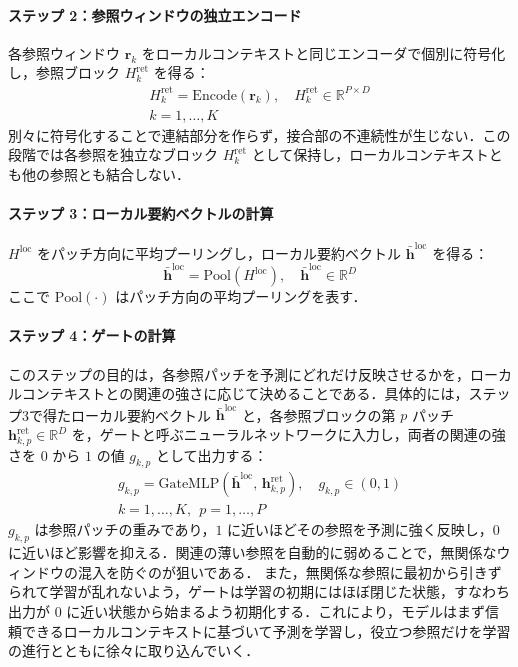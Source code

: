 \documentclass[twocolumn, lastpage]{jarticle}
\begin{document}
    \paragraph{ステップ 2：参照ウィンドウの独立エンコード}
    各参照ウィンドウ $\bm{r}_k$ をローカルコンテキストと同じエンコーダで個別に符号化し，参照ブロック $H^{\mathrm{ret}}_k$ を得る：
        \begin{align}
            H^{\mathrm{ret}}_k = \mathrm{Encode}(\bm{r}_k), \quad
            H^{\mathrm{ret}}_k \in \mathbb{R}^{P \times D} \\
            k = 1, \dots, K \nonumber
        \end{align}
    別々に符号化することで連結部分を作らず，接合部の不連続性が生じない．この段階では各参照を独立なブロック $H^{\mathrm{ret}}_k$ として保持し，ローカルコンテキストとも他の参照とも結合しない．

    \paragraph{ステップ 3：ローカル要約ベクトルの計算}
    $H^{\mathrm{loc}}$ をパッチ方向に平均プーリングし，ローカル要約ベクトル $\bar{\bm{h}}^{\mathrm{loc}}$ を得る：
        \begin{equation}
            \bar{\bm{h}}^{\mathrm{loc}} = \mathrm{Pool}(H^{\mathrm{loc}}), \quad \bar{\bm{h}}^{\mathrm{loc}} \in \mathbb{R}^{D}
        \end{equation}
    ここで $\mathrm{Pool}(\cdot)$ はパッチ方向の平均プーリングを表す．

    \paragraph{ステップ 4：ゲートの計算}
    このステップの目的は，各参照パッチを予測にどれだけ反映させるかを，ローカルコンテキストとの関連の強さに応じて決めることである．具体的には，ステップ3で得たローカル要約ベクトル $\bar{\bm{h}}^{\mathrm{loc}}$ と，各参照ブロックの第 $p$ パッチ $\bm{h}^{\mathrm{ret}}_{k,p} \in \mathbb{R}^{D}$ を，ゲートと呼ぶニューラルネットワークに入力し，両者の関連の強さを $0$ から $1$ の値 $g_{k,p}$ として出力する：
        \begin{align}
            g_{k,p} = \mathrm{GateMLP}(\bar{\bm{h}}^{\mathrm{loc}},\, \bm{h}^{\mathrm{ret}}_{k,p}), \quad
            g_{k,p} \in (0, 1) \\
            k = 1, \ldots, K,\ \ p = 1, \ldots, P \nonumber
        \end{align}
    $g_{k,p}$ は参照パッチの重みであり，$1$ に近いほどその参照を予測に強く反映し，$0$ に近いほど影響を抑える．関連の薄い参照を自動的に弱めることで，無関係なウィンドウの混入を防ぐのが狙いである．
    また，無関係な参照に最初から引きずられて学習が乱れないよう，ゲートは学習の初期にはほぼ閉じた状態，すなわち出力が $0$ に近い状態から始まるよう初期化する．これにより，モデルはまず信頼できるローカルコンテキストに基づいて予測を学習し，役立つ参照だけを学習の進行とともに徐々に取り込んでいく．
\end{document}
